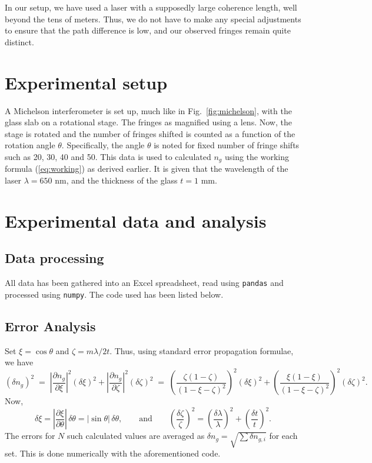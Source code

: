 \documentclass[11pt]{article}
\newcommand\pp[2]{\frac{\partial #1}{\partial #2}}
\begin{document}
        In our setup, we have used a laser with a supposedly large coherence length, well beyond the tens of meters. Thus, we do not
        have to make any special adjustments to ensure that the path difference is low, and our observed fringes remain quite distinct.
        
        \section{Experimental setup}
        A Michelson interferometer is set up, much like in Fig.~\ref{fig:michelson}, with the glass slab on a rotational stage. The fringes
        as magnified using a lens. Now, the stage is rotated and the number of fringes shifted is counted as a function of the rotation angle $\theta$.
        Specifically, the angle $\theta$ is noted for fixed number of fringe shifts such as 20, 30, 40 and 50. This data is used
        to calculated $n_g$ using the working formula (\ref{eq:working}) as derived earlier.
        It is given that the wavelength of the laser $\lambda = 650$ nm, and the thickness of the glass $t = 1$ mm.

        \section{Experimental data and analysis}
        
        \subsection{Data processing}
        
        All data has been gathered into an Excel spreadsheet, read using \texttt{pandas} and processed using \texttt{numpy}.
        The code used has been listed below.

        

        \subsection{Error Analysis}
        Set $\xi = \cos\theta$ and $\zeta = m\lambda / 2t$. Thus, using standard error propagation formulae, we have
        \[
                \left(\delta n_g\right)^2 \;=\; \left|\pp{n_g}{\xi}\right|^2(\delta\xi)^2 + \left|\pp{n_g}{\zeta}\right|^2(\delta\zeta)^2
                        \;=\; \left(\frac{\zeta(1 - \zeta)}{(1 - \xi - \zeta)^2}\right)^2(\delta\xi)^2 + 
                                        \left(\frac{\xi(1 - \xi)}{(1 - \xi - \zeta)^2}\right)^2(\delta\zeta)^2 .
        \]
        Now,
        \[
                \delta\xi = \left|\frac{\partial \xi}{\partial\theta}\right|\,\delta\theta = |\sin\theta|\,\delta\theta,
                \qquad\text{and}\qquad
                \left(\frac{\delta\zeta}{\zeta}\right)^2 = \left(\frac{\delta\lambda}{\lambda}\right)^2 + \left(\frac{\delta t}{t}\right)^2.
        \]
        The errors for $N$ such calculated values are averaged as $\delta n_g = \sqrt{\sum\delta n_{g, i}}$ for each set.
        This is done numerically with the aforementioned code.
\end{document}
